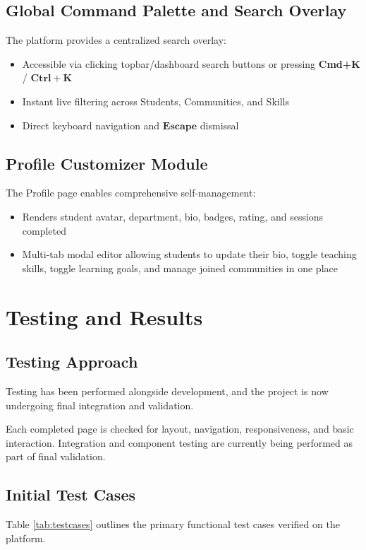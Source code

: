 \documentclass[12pt,a4paper]{report}
\begin{document}
\section{Global Command Palette and Search Overlay}
The platform provides a centralized search overlay:
\begin{itemize}
    \item Accessible via clicking topbar/dashboard search buttons or pressing \textbf{Cmd+K} / $\mathbf{Ctrl+K}$
    \item Instant live filtering across Students, Communities, and Skills
    \item Direct keyboard navigation and $\mathbf{Escape}$ dismissal
\end{itemize}

\section{Profile Customizer Module}
The Profile page enables comprehensive self-management:
\begin{itemize}
    \item Renders student avatar, department, bio, badges, rating, and sessions completed
    \item Multi-tab modal editor allowing students to update their bio, toggle teaching skills, toggle learning goals, and manage joined communities in one place
\end{itemize}

\newpage
\chapter{Testing and Results}

\section{Testing Approach}
Testing has been performed alongside development, and the project is now undergoing final integration and validation.

Each completed page is checked for layout, navigation, responsiveness, and basic interaction.
Integration and component testing are currently being performed as part of final validation.

\section{Initial Test Cases}
Table \ref{tab:testcases} outlines the primary functional test cases verified on the platform.
\end{document}
